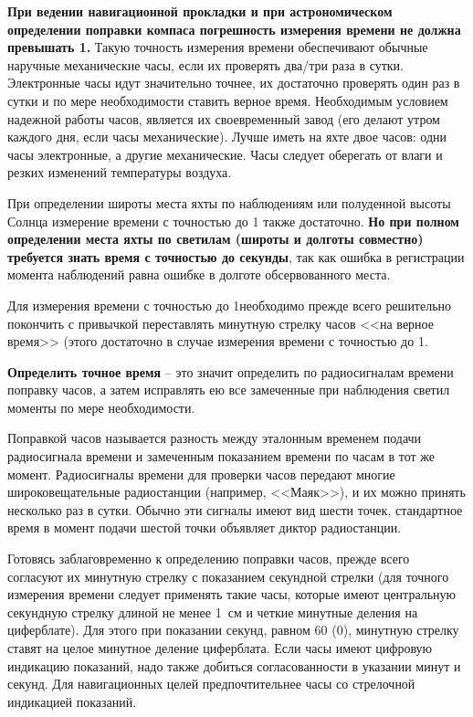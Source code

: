 \textbf{При ведении навигационной прокладки и при астрономическом
  определении поправки компаса погрешность измерения времени не должна
  превышать 1\tmin.} Такую точность измерения времени обеспечивают
обычные наручные механические часы, если их проверять два\-/три раза в
сутки. Электронные часы идут значительно точнее, их достаточно
проверять один раз в сутки и по мере необходимости ставить верное
время. Необходимым условием надежной работы часов, является их
своевременный завод (его делают утром каждого дня, если часы
механические). Лучше иметь на яхте двое часов: одни часы электронные,
а другие механические. Часы следует оберегать от влаги и резких
изменений температуры воздуха.

При определении широты места яхты по наблюдениям 
или полуденной высоты Солнца измерение времени с точностью до 1\tmin
также достаточно.\textbf{ Но при полном определении места яхты по
  светилам (широты и долготы совместно) требуется знать время с
  точностью до секунды}, так как ошибка в регистрации момента
наблюдений равна ошибке в долготе обсервованного места.

Для измерения времени с точностью до 1\tsec необходимо прежде всего
решительно покончить с привычкой переставлять минутную стрелку часов
<<на верное время>> (этого достаточно в случае измерения времени с
точностью до 1\tmin.

\textbf{Определить точное время} \--- это значит определить по
радиосигналам времени поправку часов, а затем исправлять ею все
замеченные при наблюдения светил моменты по мере необходимости.

Поправкой часов называется разность между эталонным временем подачи
радиосигнала времени и замеченным показанием времени по часам в тот же
момент. Радиосигналы времени для проверки часов передают многие
широковещательные радиостанции (например, <<Маяк>>), и их можно
принять несколько раз в сутки. Обычно эти сигналы имеют вид шести
точек, стандартное время в момент подачи шестой точки объявляет диктор
радиостанции.

Готовясь заблаговременно к определению поправки часов, прежде всего
согласуют их минутную стрелку с показанием секундной стрелки (для
точного измерения времени следует применять такие часы, которые имеют
центральную секундную стрелку длиной не менее 1~см и четкие минутные
деления на циферблате). Для этого при показании секунд, равном 60\tsec
(0\tsec), минутную стрелку ставят на целое минутное деление
циферблата. Если часы имеют цифровую индикацию показаний, надо также
добиться согласованности в указании минут и секунд. Для навигационных
целей предпочтительнее часы со стрелочной индикацией показаний.

